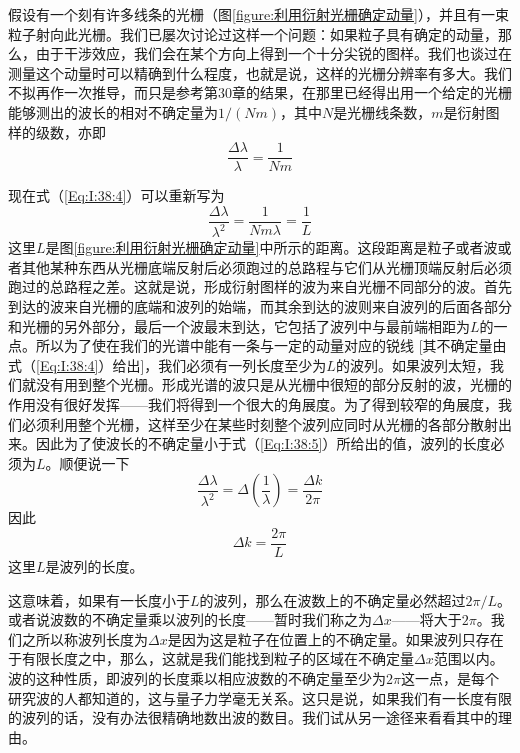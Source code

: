 假设有一个刻有许多线条的光栅（图\ref{figure:利用衍射光栅确定动量}），并且有一束粒子射向此光栅。我们已屡次讨论过这样一个问题：如果粒子具有确定的动量，那么，由于干涉效应，我们会在某个方向上得到一个十分尖锐的图样。我们也谈过在测量这个动量时可以精确到什么程度，也就是说，这样的光栅分辨率有多大。我们不拟再作一次推导，而只是参考第30章的结果，在那里已经得出用一个给定的光栅能够测出的波长的相对不确定量为$1/(Nm)$，其中$N$是光栅线条数，$m$是衍射图样的级数，亦即
\begin{equation}
    \label{Eq:I:38:4}
    \frac{\Delta\lambda}{\lambda} = \frac{1}{Nm}
\end{equation}

现在式（\ref{Eq:I:38:4}）可以重新写为
\begin{equation}
    \label{Eq:I:38:5}
    \frac{\Delta\lambda}{\lambda^2} = \frac{1}{Nm\lambda} = \frac{1}{L}
\end{equation}
这里$L$是图\ref{figure:利用衍射光栅确定动量}中所示的距离。这段距离是粒子或者波或者其他某种东西从光栅底端反射后必须跑过的总路程与它们从光栅顶端反射后必须跑过的总路程之差。这就是说，形成衍射图样的波为来自光栅不同部分的波。首先到达的波来自光栅的底端和波列的始端，而其余到达的波则来自波列的后面各部分和光栅的另外部分，最后一个波最末到达，它包括了波列中与最前端相距为$L$的一点。所以为了使在我们的光谱中能有一条与一定的动量对应的锐线 [其不确定量由式（\ref{Eq:I:38:4}）给出]，我们必须有一列长度至少为$L$的波列。如果波列太短，我们就没有用到整个光栅。形成光谱的波只是从光栅中很短的部分反射的波，光栅的作用没有很好发挥——我们将得到一个很大的角展度。为了得到较窄的角展度，我们必须利用整个光栅，这样至少在某些时刻整个波列应同时从光栅的各部分散射出来。因此为了使波长的不确定量小于式（\ref{Eq:I:38:5}）所给出的值，波列的长度必须为$L$。顺便说一下
\begin{equation}
    \label{Eq:I:38:6}
    \frac{\Delta\lambda}{\lambda^2} = \Delta\left ( \frac{1}{\lambda} \right ) = \frac{\Delta k}{2\pi}
\end{equation}
因此
\begin{equation}
    \label{Eq:I:38:7}
    \Delta k = \frac{2\pi}{L}
\end{equation}
这里$L$是波列的长度。

这意味着，如果有一长度小于$L$的波列，那么在波数上的不确定量必然超过$2\pi/L$。或者说波数的不确定量乘以波列的长度——暂时我们称之为$\Delta x$——将大于$2\pi$。我们之所以称波列长度为$\Delta x$是因为这是粒子在位置上的不确定量。如果波列只存在于有限长度之中，那么，这就是我们能找到粒子的区域在不确定量$\Delta x$范围以内。波的这种性质，即波列的长度乘以相应波数的不确定量至少为$2\pi$这一点，是每个研究波的人都知道的，这与量子力学毫无关系。这只是说，如果我们有一长度有限的波列的话，没有办法很精确地数出波的数目。我们试从另一途径来看看其中的理由。

